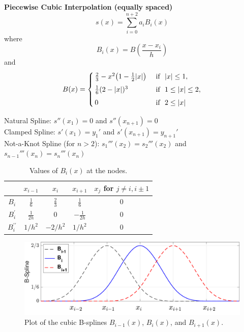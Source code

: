 \documentclass[12pt]{article}
\begin{document}
\newpage\noindent
\textbf{Piecewise Cubic Interpolation (equally spaced)}
\[
s(x)=\sum_{i=0}^{n+2}a_i B_i (x)
\tag{5.27}
\]
\hspace{1in} where
\[
B_{i}(x)= B \!\! \left ( \frac{x-x_i}{h}\right )
\tag{5.23}
\]
\hspace{1in} and
\[
B (x)=
\begin{cases}
{\,  \frac{2}{3}  - x^2 \! \left (1- \frac{1}{2} |x| \right ) } &\text{ if \,\,}   |x| \leq 1,  \\[0.4em]
{ \,  \frac{1}{6}(2- |x|)^3 } & \text{ if \,\,} 1 \leq |x| \leq 2, \\[0.4em]
 \, 0 & \text{ if \,\,} 2 \le |x|
\end{cases}
\]

\bigskip\noindent
Natural Spline:  $s''(x_1)=0$ and $s''(x_{n+1})=0$\\[0.2em]
\noindent
Clamped Spline:  $s'(x_1)=y_1'$ and $s'(x_{n+1})=y_{n+1}'$\\[0.2em]
\noindent
Not-a-Knot Spline (for $n >2$):  $s_1'''(x_2)=s_2'''(x_2)$ and $s_{n-1}'''(x_{n})=s_n'''(x_{n})$\\


\begin{table}[h]
\centering
\renewcommand\arraystretch{2}
\renewcommand\tabcolsep{6pt}
\begin{tabular}{c|c|c|c|c} 
 & {\normalsize $x_{i-1}$} & {\normalsize $x_i$} & {\normalsize $x_{i+1}$} & {\normalsize $x_{j}$} for {\normalsize $j \ne  i , i\pm1$} \\ \hline
{\normalsize $B_i$}  & {\large $\frac{1}{6}$} & {\large $\frac{2}{3}$}& {\large $\frac{1}{6}$} & {\normalsize $0$}\\ \hline
{\normalsize $B_i^{\prime}$}  & {\large $\frac{1}{2h}$} & {\normalsize $0$}&  {\large $- \frac{1}{2h}$} & {\normalsize $0$}\\ \hline
{\normalsize $B_i^{\prime \prime}$}  &  $1/h^2$ & $-2/h^2$ & $1/h^2$ & {\normalsize $0$} \\ 
\end{tabular}
\caption{Values of $B_i(x)$ at the nodes.}
\end{table}

\begin{figure}[b]
\centering
\includegraphics[width=5.2in]{bspline.pdf}
\caption{Plot of the cubic B-splines $B_{i-1}(x)$, $B_i(x)$, and  $B_{i+1}(x)$. }
\label{fig:inter.b}
\end{figure}

















 
\end{document}
